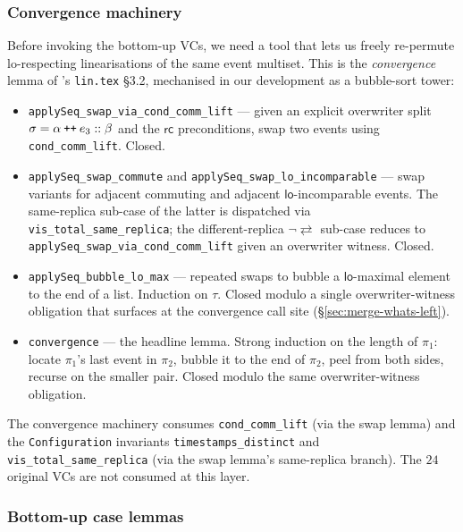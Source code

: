 \documentclass[11pt,a4paper]{article}
\theoremstyle{definition}
\theoremstyle{remark}
\newcommand{\mrc}{\mathsf{rc}}
\newcommand{\mlo}{\mathsf{lo}}
\newcommand{\commute}{\mathrel{\rightleftarrows}}
\begin{document}
\subsubsection{Convergence machinery}
\label{sec:merge-convergence}

Before invoking the bottom-up VCs, we need a tool that lets us
freely re-permute lo-respecting linearisations of the same event
multiset. This is the \emph{convergence} lemma of \cite{sal2025}'s
\texttt{lin.tex} §3.2, mechanised in our development as a
bubble-sort tower:
\begin{itemize}[leftmargin=*]
  \item \texttt{applySeq\_swap\_via\_cond\_comm\_lift} --- given
    an explicit overwriter split $\sigma = \alpha \mathbin{\text{\tt ++}} e_3 :: \beta$
    and the $\mrc$ preconditions, swap two events using
    \texttt{cond\_comm\_lift}. Closed.
  \item \texttt{applySeq\_swap\_commute} and
    \texttt{applySeq\_swap\_lo\_incomparable} --- swap variants
    for adjacent commuting and adjacent
    $\mlo$-incomparable events. The same-replica
    sub-case of the latter is dispatched via
    \texttt{vis\_total\_same\_replica}; the different-replica
    $\neg \commute$ sub-case reduces to
    \texttt{applySeq\_swap\_via\_cond\_comm\_lift} given an
    overwriter witness. Closed.
  \item \texttt{applySeq\_bubble\_lo\_max} --- repeated swaps to
    bubble a $\mlo$-maximal element to the end of a list.
    Induction on $\tau$. Closed modulo a single overwriter-witness
    obligation that surfaces at the convergence call site
    (\S\ref{sec:merge-whats-left}).
  \item \texttt{convergence} --- the headline lemma. Strong
    induction on the length of $\pi_1$: locate $\pi_1$'s last
    event in $\pi_2$, bubble it to the end of $\pi_2$, peel from
    both sides, recurse on the smaller pair. Closed modulo the
    same overwriter-witness obligation.
\end{itemize}
The convergence machinery consumes \texttt{cond\_comm\_lift}
(via the swap lemma) and the \texttt{Configuration} invariants
\texttt{timestamps\_distinct} and \texttt{vis\_total\_same\_replica}
(via the swap lemma's same-replica branch). The $24$ original VCs
are not consumed at this layer.

\subsubsection{Bottom-up case lemmas}
\label{sec:merge-bottomup}
\end{document}
